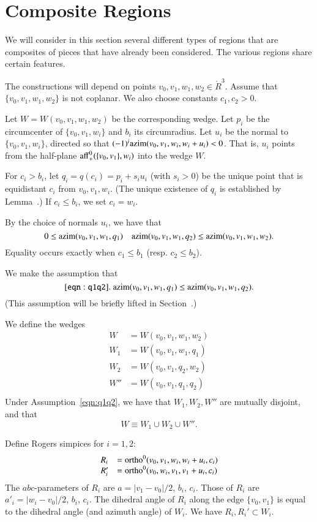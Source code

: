 \section{Composite Regions}

We will consider in this section several different types
of regions that are composites of pieces that have already been
considered.  The various regions share certain features.

The constructions will depend on points
 $v_0,v_1,w_1,w_2\in\ring{R}^3$. Assume that $\{v_0,v_1,w_1,w_2\}$
is not coplanar.  We also choose constants $c_1,c_2>0$.


Let
$W=W(v_0,v_1,w_1,w_2)$ be the corresponding wedge.  
Let $p_i$ be the circumcenter of
$\{v_0,v_1,w_i\}$ and $b_i$ its circumradius.
Let $u_i$ be the normal to $\{v_0,v_1,w_i\}$, directed so that
$(-1)^i{\operatorname{azim}}(v_0,v_1,w_i,w_i+u_i) < 0$.  That is, $u_i$ points
from the half-plane ${\operatorname{aff}}_+^0(\{v_0,v_1\},w_i)$ into the wedge $W$.

For $c_i > b_i$, let $q_i = q(c_i) = p_i + s_i u_i$ (with $s_i>0$) be the
unique point that is equidistant $c_i$ from $v_0,v_1,w_i$.
(The unique existence of $q_i$ is established by Lemma~.)
If $c_i\le b_i$, we set $c_i=w_i$.

By the choice of normals $u_i$, we have that
 $$
 0\le {\operatorname{azim}}(v_0,v_1,w_1,q_1)\quad
 {\operatorname{azim}}(v_0,v_1,w_1,q_2) \le {\operatorname{azim}}(v_0,v_1,w_1,w_2).
 $$
Equality occurs exactly when $c_1\le b_1$ (resp. $c_2\le b_2$).

We make the assumption that
\begin{equation}\tlabel{eqn:q1q2}
\op{azim}(v_0,v_1,w_1,q_1) \le \op{azim}(v_0,v_1,w_1,q_2).
\end{equation}
(This assumption will be briefly lifted in Section~.)

We define the wedges 
$$
   \begin{array}{lll}
   W &= W(v_0,v_1,w_1,w_2)\\
   W_1 &= W(v_0,v_1,w_1,q_1)\\
   W_2 &= W(v_0,v_1,q_2,w_2)\\
   W'' &= W(v_0,v_1,q_1,q_2)\\
   \end{array}
$$
Under Assumption~\ref{eqn:q1q2}, we have that
$W_1,W_2,W''$ are mutually disjoint, and that
   $$
   W \equiv W_1 \cup W_2 \cup W''.
   $$

Define Rogers simpices for $i=1,2$:
  $$
  \begin{array}{lll}
  R_i &= {\operatorname{ortho}}^0(v_0,v_1,w_i,w_i+u_i,c_i)\\
  R_i'&= {\operatorname{ortho}}^0(v_0,w_i,v_1,v_1+u_i,c_i)\\
  \end{array}
  $$
The $abc$-parameters of $R_i$ are $a=|v_1-v_0|/2$, $b_i$, $c_i$.
Those of $R_i$ are $a'_i=|w_i-v_0|/2$, $b_i$, $c_i$.
The dihedral angle of $R_i$ along the edge $\{v_0,v_1\}$ is
equal to the dihedral angle (and azimuth angle) of $W_i$.
We have $R_i,R_i'\subset W_i$.

